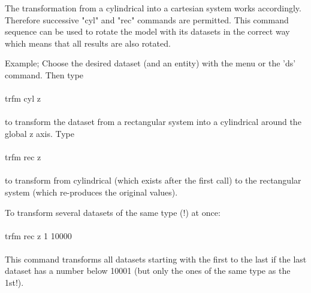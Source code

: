 \documentclass{article}
\begin{document}
The transformation from a cylindrical into a cartesian system works accordingly. Therefore successive "cyl" and "rec" commands are permitted. This command sequence can be used to rotate the model with its datasets in the correct way which means that all results are also rotated.

Example; Choose the desired dataset (and an entity) with the menu or the 'ds' command. Then type\\\\

trfm cyl z\\\\

to transform the dataset from a rectangular system into a cylindrical around the global z axis. Type\\\\

trfm rec z\\\\

to transform from cylindrical (which exists after the first call) to 
the rectangular system (which re-produces the original values).

To transform several datasets of the same type (!) at once:\\\\

trfm rec z 1 10000\\\\

This command transforms all datasets starting with the first to the last if the 
last dataset has a number below 10001 (but only the ones of the same type as 
the 1st!).
\end{document}
